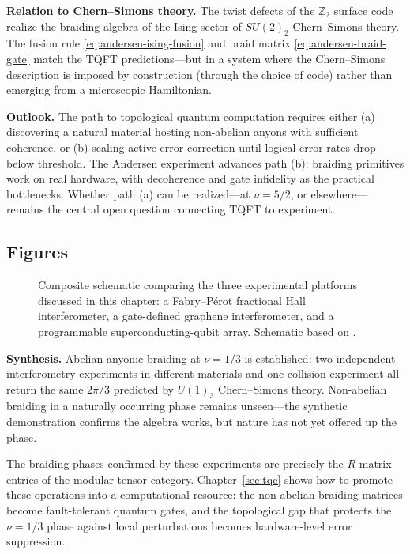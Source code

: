 \medskip
\noindent\textbf{Relation to Chern--Simons theory.}
The twist defects of the $\mathbb{Z}_2$ surface code realize the braiding algebra of the Ising sector of $SU(2)_2$ Chern--Simons theory.  The fusion rule \eqref{eq:andersen-ising-fusion} and braid matrix \eqref{eq:andersen-braid-gate} match the TQFT predictions---but in a system where the Chern--Simons description is imposed by construction (through the choice of code) rather than emerging from a microscopic Hamiltonian.

\medskip
\noindent\textbf{Outlook.}
The path to topological quantum computation requires either (a) discovering a natural material hosting non-abelian anyons with sufficient coherence, or (b) scaling active error correction until logical error rates drop below threshold.  The Andersen experiment advances path (b): braiding primitives work on real hardware, with decoherence and gate infidelity as the practical bottlenecks.  Whether path (a) can be realized---at $\nu = 5/2$, or elsewhere---remains the central open question connecting TQFT to experiment.

\subsection{Figures}
\label{subsec:experiment-figures}

\begin{figure}[h]
    \centering
    
    \caption{Composite schematic comparing the three experimental platforms discussed in this chapter: a Fabry--P\'erot fractional Hall interferometer, a gate-defined graphene interferometer, and a programmable superconducting-qubit array. Schematic based on \cite{Nakamura2020AnyonicBraiding,Werkmeister2024GrapheneInterferometer,Andersen2023NonAbelianBraiding}.}
    \label{fig:experiment-comparison}
\end{figure}

\medskip

\noindent\textbf{Synthesis.}
Abelian anyonic braiding at $\nu = 1/3$ is established: two independent interferometry experiments in different materials and one collision experiment all return the same $2\pi/3$ predicted by $U(1)_3$ Chern--Simons theory.  Non-abelian braiding in a naturally occurring phase remains unseen---the synthetic demonstration confirms the algebra works, but nature has not yet offered up the phase.

\noindent The braiding phases confirmed by these experiments are precisely the $R$-matrix entries of the modular tensor category.  Chapter~\ref{sec:tqc} shows how to promote these operations into a computational resource: the non-abelian braiding matrices become fault-tolerant quantum gates, and the topological gap that protects the $\nu = 1/3$ phase against local perturbations becomes hardware-level error suppression.
